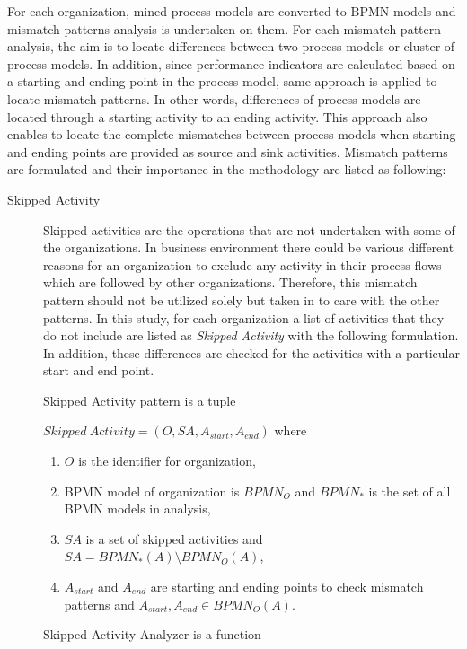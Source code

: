 For each organization, mined process models are converted to BPMN models and mismatch patterns analysis is undertaken on them. For each mismatch pattern analysis, the aim is to locate differences between two process models or cluster of process models. In addition, since performance indicators are calculated based on a starting and ending point in the process model, same approach is applied to locate mismatch patterns. In other words, differences of process models are located through a starting activity to an ending activity. This approach also enables to locate the complete mismatches between process models when starting and ending points are provided as source and sink activities. Mismatch patterns are formulated and their importance in the methodology are listed as following:
\begin{description}
  \item[Skipped Activity] Skipped activities are the operations that are not undertaken with some of the organizations. In business environment there could be various different reasons for an organization to exclude any activity in their process flows which are followed by other organizations. Therefore, this mismatch pattern should not be utilized solely but taken in to care with the other patterns. In this study, for each organization a list of activities that they do not include are listed as \textit{Skipped Activity} with the following formulation. In addition, these differences are checked for the activities with a particular start and end point. 
		\theoremstyle{definition}
		\begin{definition}
		Skipped Activity pattern is a tuple 

		${Skipped\ Activity} = (O, SA, A_{start}, A_{end}) $ where 
		\begin{enumerate}
		  \item $O$ is the identifier for organization,
		  \item BPMN model of organization is $BPMN_{O}$ and $BPMN_{*}$ is the set of all BPMN models in analysis,
		  \item $SA$ is a set of skipped activities and $SA =  BPMN_{*}(A) \setminus BPMN_{O}(A)$,
		  \item $A_{start}$ and $A_{end}$ are starting and ending points to check mismatch patterns and $A_{start}, A_{end} \in BPMN_{O}(A)$.
		\end{enumerate}
		\end{definition}

		\theoremstyle{definition}
		\begin{definition}
		Skipped Activity Analyzer is a function 


\end{definition}
\end{description}

